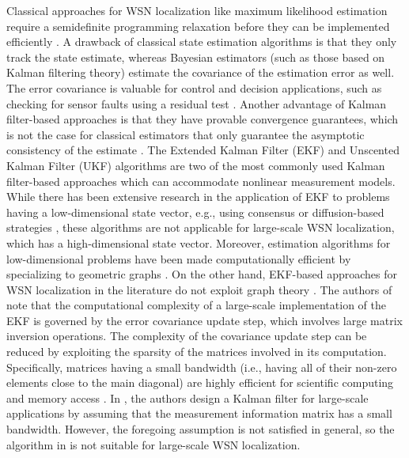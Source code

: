 \documentclass[twocolumn]{article}
\theoremstyle{plain}
\theoremstyle{definition}
\theoremstyle{definition}
\theoremstyle{remark}
\begin{document}
Classical approaches for WSN localization like maximum likelihood estimation require a semidefinite programming relaxation before they can be implemented efficiently \cite{sdp2018}. A drawback of classical state estimation algorithms is that they only track the state estimate, whereas Bayesian estimators (such as those based on Kalman filtering theory) estimate the covariance of the estimation error as well. The error covariance is valuable for control and decision applications, such as checking for sensor faults using a residual test \cite{khan2022robust}. Another advantage of Kalman filter-based approaches is that they have provable convergence guarantees, which is not the case for classical estimators that only guarantee the asymptotic consistency of the estimate \cite{ekf1995, ekf1999}. The Extended Kalman Filter (EKF) and Unscented Kalman Filter (UKF) algorithms are two of the most commonly used Kalman filter-based approaches which can accommodate nonlinear measurement models. 
While there has been extensive research in the application of EKF to problems having a low-dimensional state vector, e.g., using consensus or diffusion-based strategies \cite{consensus}, these algorithms are not applicable for large-scale WSN localization, which has a high-dimensional state vector. Moreover, estimation algorithms for low-dimensional problems have been made computationally efficient by specializing to geometric graphs \cite{dimakis2006geographic}. On the other hand, EKF-based approaches for WSN localization in the literature do not exploit graph theory \cite{2002ekf, 2019ekf}. The authors of \cite{moura2008distributing} note that the computational complexity of a large-scale implementation of the EKF is governed by the error covariance update step, which involves large matrix inversion operations. The complexity of the covariance update step can be reduced by exploiting the sparsity of the matrices involved in its computation. Specifically, matrices having a small bandwidth (i.e., having all of their non-zero elements close to the main diagonal) are highly efficient for scientific computing and memory access \cite{kavcic2000matrices, liao2016improved_band_matrix_computation, rcm2017}. In \cite{moura2008distributing}, the authors design a Kalman filter for large-scale applications by assuming that the measurement information matrix has a small bandwidth. 
However, the foregoing assumption is not satisfied in general, so the algorithm in \cite{moura2008distributing} is not suitable for large-scale WSN localization.
\end{document}
